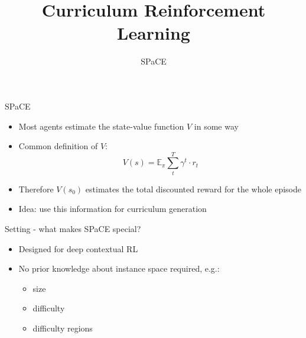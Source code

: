 \documentclass[aspectratio=169]{../latex_main/tntbeamer}  %
\title[Curriculum RL]{Curriculum Reinforcement Learning}
\subtitle{SPaCE}
\begin{document}
	
	\maketitle

\begin{frame}[c]{SPaCE~}
	
	\begin{itemize}
		\item Most agents estimate the state-value function $V$ in some way
		\item Common definition of $V$: 
			$$ V(s) = \mathbb{E}_{\pi} \sum_t^T \gamma^t \cdot r_t $$
		\item Therefore $V(s_0)$ estimates the total discounted reward for the whole episode
		\item Idea: use this information for curriculum generation
	\end{itemize}
	
\end{frame}


\begin{frame}[c]{Setting - what makes SPaCE special?}
	
	\begin{itemize}
		\item Designed for deep contextual RL
		\item No prior knowledge about instance space required, e.g.:
		\begin{itemize}
			\item size
			\item difficulty
			\item difficulty regions
		\end{itemize}
	\end{itemize}
	
\end{frame}
\end{document}
